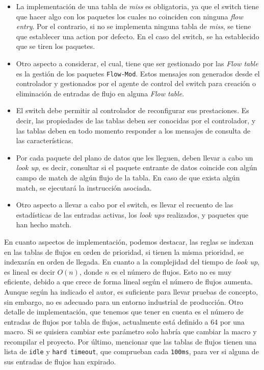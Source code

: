 \begin{itemize}
    \item La implementación de una tabla de \textit{miss} es obligatoria, ya que el switch tiene que hacer algo con los paquetes los cuales no coinciden con ninguna \textit{flow entry}. Por el contrario, si no se implementa ninguna tabla de \textit{miss}, se tiene que establecer una action por defecto. En el caso del switch, se ha establecido que se tiren los paquetes.

    \item Otro aspecto a considerar, el cual, tiene que ser gestionado por las \textit{Flow table} es la gestión de los paquetes \texttt{Flow-Mod}. Estos mensajes son generados desde el controlador y gestionados por el agente de control del switch para creación o eliminación de entradas de flujo en alguna \textit{Flow table}.

    \item El switch debe permitir al controlador de reconfigurar sus prestaciones. Es decir, las propiedades de las tablas deben ser conocidas por el controlador, y las tablas deben en todo momento responder a los mensajes de consulta de las características.

    \item Por cada paquete del plano de datos que les lleguen, deben llevar a cabo un \textit{look up},  es decir, consultar si el paquete entrante de datos coincide con algún campo de match de algún flujo de la tabla. En caso de que exista algún match, se ejecutará la instrucción asociada.

    \item  Otro aspecto a llevar a cabo por el switch, es llevar el recuento de las estadísticas de las entradas activas, los \textit{look ups} realizados, y paquetes que han hecho match.
\end{itemize}


En cuanto aspectos de implementación, podemos destacar, las reglas se indexan en las tablas de flujos en orden de prioridad, si tienen la misma prioridad, se indexarán en orden de llegada. En cuanto a la complejidad del tiempo de \textit{look up}, es lineal es decir $O(n)$, donde $n$ es el número de flujos. Esto no es muy eficiente, debido a que crece de forma lineal según el número de flujos aumenta. Aunque según ha indicado el autor, es suficiente para llevar pruebas de concepto, sin embargo, no es adecuado para un entorno industrial de producción. Otro detalle de implementación, que tenemos que tener en cuenta es el número de entradas de flujos por tabla de flujos, actualmente está definido a 64 por una macro.  Si se quisiera cambiar este parámetro solo habría que cambiar la macro y recompilar el proyecto. Por último, mencionar que las tablas de flujos tienen una lista de \texttt{idle} y \texttt{hard timeout}, que comprueban cada \texttt{100ms}, para ver si alguna de sus entradas de flujos han expirado.

